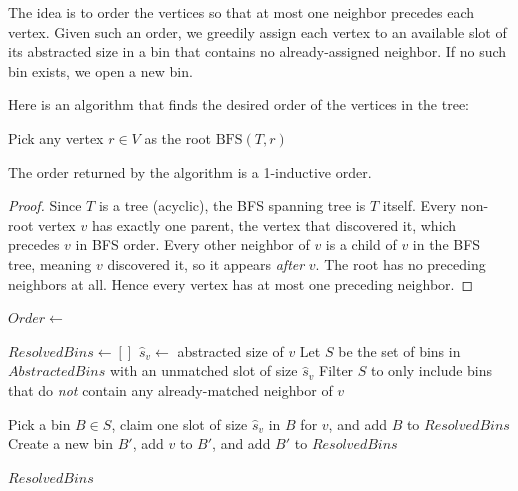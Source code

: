 The idea is to order the vertices so that at most one neighbor precedes each vertex. Given such an order, we greedily assign each vertex to an available slot of its abstracted size in a bin that contains no already-assigned neighbor. If no such bin exists, we open a new bin.

Here is an algorithm that finds the desired order of the vertices in the tree:
\begin{algorithm}
  \caption{1-inductive tree ordering}
  \begin{algorithmic}[1]
      \State Pick any vertex $r \in V$ as the root
      \State \Return $\text{BFS}(T, r)$ 
    \EndProcedure
  \end{algorithmic}
\end{algorithm}

\begin{claim}
The order returned by the algorithm is a 1-inductive order.
\end{claim}

\begin{proof}
Since $T$ is a tree (acyclic), the BFS spanning tree is $T$ itself.
Every non-root vertex $v$ has exactly one parent, the vertex that
discovered it, which precedes $v$ in BFS order. Every other neighbor
of $v$ is a child of $v$ in the BFS tree, meaning $v$ discovered
it, so it appears \emph{after} $v$. The root has no preceding
neighbors at all. Hence every vertex has at most one preceding
neighbor.
\end{proof}

\begin{algorithm}
  \caption{Conflict resolution for Bin Packing with Trees}
  \begin{algorithmic}[1]
    \State $Order \gets$ 

    \State $ResolvedBins \gets []$
      \State $\hat{s}_v \gets$ abstracted size of $v$
      \State Let $S$ be the set of bins in $AbstractedBins$ with an unmatched slot of size $\hat{s}_v$
      \State Filter $S$ to only include bins that do \emph{not} contain any already-matched neighbor of $v$

        \State Pick a bin $B \in S$, claim one slot of size $\hat{s}_v$ in $B$ for $v$, and add $B$ to $ResolvedBins$
      \Else
        \State Create a new bin $B'$, add $v$ to $B'$, and add $B'$ to $ResolvedBins$
      \EndIf
    \EndFor

    \State \Return $ResolvedBins$

    \EndProcedure
    \end{algorithmic}
\end{algorithm}

